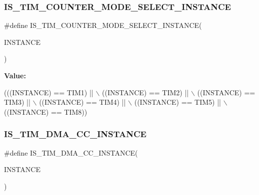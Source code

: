 \subsubsection{\texorpdfstring{I\+S\+\_\+\+T\+I\+M\+\_\+\+C\+O\+U\+N\+T\+E\+R\+\_\+\+M\+O\+D\+E\+\_\+\+S\+E\+L\+E\+C\+T\+\_\+\+I\+N\+S\+T\+A\+N\+CE}{IS\_TIM\_COUNTER\_MODE\_SELECT\_INSTANCE}}
{\footnotesize\ttfamily \#define I\+S\+\_\+\+T\+I\+M\+\_\+\+C\+O\+U\+N\+T\+E\+R\+\_\+\+M\+O\+D\+E\+\_\+\+S\+E\+L\+E\+C\+T\+\_\+\+I\+N\+S\+T\+A\+N\+CE(\begin{DoxyParamCaption}\item[{}]{I\+N\+S\+T\+A\+N\+CE }\end{DoxyParamCaption})}

{\bfseries Value\+:}
\begin{DoxyCode}
(((INSTANCE) == TIM1) || \(\backslash\)
                                                        ((INSTANCE) == TIM2) || \(\backslash\)
                                                        ((INSTANCE) == TIM3) || \(\backslash\)
                                                        ((INSTANCE) == TIM4) || \(\backslash\)
                                                        ((INSTANCE) == TIM5) || \(\backslash\)
                                                        ((INSTANCE) == TIM8))
\end{DoxyCode}
\mbox{\label{group___exported__macros_gad80a186286ce3daa92249a8d52111aaf}} 
\subsubsection{\texorpdfstring{I\+S\+\_\+\+T\+I\+M\+\_\+\+D\+M\+A\+\_\+\+C\+C\+\_\+\+I\+N\+S\+T\+A\+N\+CE}{IS\_TIM\_DMA\_CC\_INSTANCE}}
{\footnotesize\ttfamily \#define I\+S\+\_\+\+T\+I\+M\+\_\+\+D\+M\+A\+\_\+\+C\+C\+\_\+\+I\+N\+S\+T\+A\+N\+CE(\begin{DoxyParamCaption}\item[{}]{I\+N\+S\+T\+A\+N\+CE }\end{DoxyParamCaption})}

